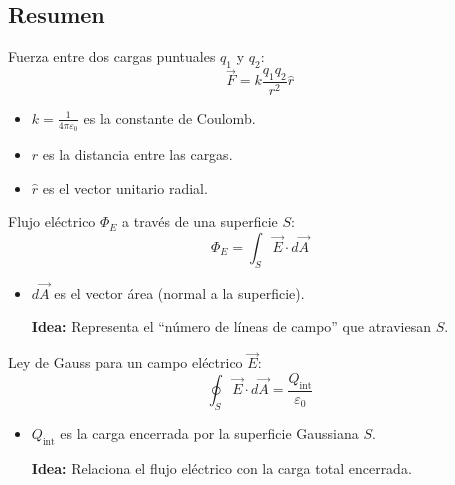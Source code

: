 \subsection{Resumen}

\begin{tcolorbox}[title=Ley de Coulomb]
  Fuerza entre dos cargas puntuales \(q_1\) y \(q_2\):
  \[
    \vec{F} = k \frac{q_1 q_2}{r^2} \hat{r}
  \]
  \begin{itemize}
    \item \(k = \frac{1}{4\pi\varepsilon_0}\) es la constante de Coulomb.
    \item \(r\) es la distancia entre las cargas.
    \item \(\hat{r}\) es el vector unitario radial.
  \end{itemize}
\end{tcolorbox}

\begin{tcolorbox}[title=Flujo Eléctrico]
  Flujo eléctrico \(\Phi_E\) a través de una superficie \(S\):
  \[
    \Phi_E = \int_S \vec{E} \cdot d\vec{A}
  \]
  \begin{itemize}
    \item \(d\vec{A}\) es el vector área (normal a la superficie).
    \item[\textbf{Idea:}] Representa el ``número de líneas de campo'' que atraviesan \(S\).
  \end{itemize}  
\end{tcolorbox}

\begin{tcolorbox}[title=Ley de Gauss]
  Ley de Gauss para un campo eléctrico \(\vec{E}\):
  \[
    \oint_S \vec{E} \cdot d\vec{A} = \frac{Q_{\text{int}}}{\varepsilon_0}
  \]
  \begin{itemize}
    \item \(Q_{\text{int}}\) es la carga encerrada por la superficie Gaussiana \(S\).
    \item[\textbf{Idea:}] Relaciona el flujo eléctrico con la carga total encerrada.
  \end{itemize}  
\end{tcolorbox}

